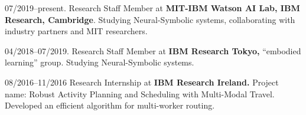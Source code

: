 \documentclass[letterpaper,11pt]{article}
\begin{document}
\begin{CV}
\item[07/2019--present.] Research Staff Member at \textbf{MIT-IBM Watson AI Lab, IBM Research, Cambridge}.
 Studying Neural-Symbolic systems, collaborating with industry partners and MIT researchers.

\item[04/2018--07/2019.] Research Staff Member at \textbf{IBM Research Tokyo,} ``embodied learning'' group.
 Studying Neural-Symbolic systems.

\item[08/2016--11/2016] Research Internship at \textbf{IBM Research Ireland.}
 Project name: Robust Activity Planning and Scheduling with Multi-Modal Travel.
 Developed an efficient algorithm for multi-worker routing.




\end{CV}
\end{document}
